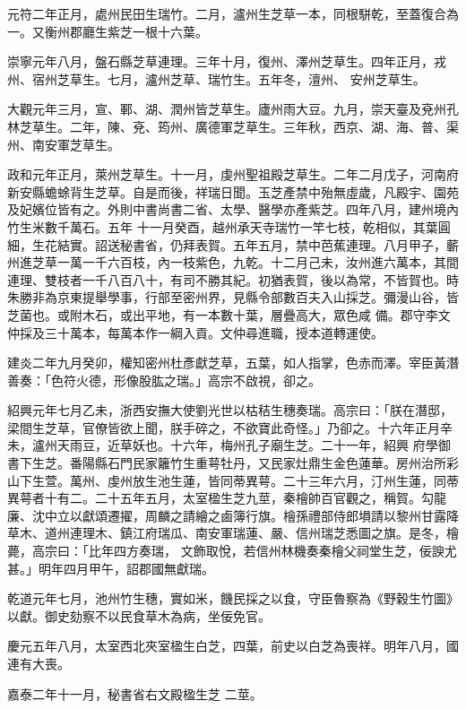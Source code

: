 \begin{pinyinscope}
 元符二年正月，處州民田生瑞竹。二月，瀘州生芝草一本，同根駢乾，至蓋復合為一。又衡州郡廳生紫芝一根十六葉。



 崇寧元年八月，盤石縣芝草連理。三年十月，復州、澤州芝草生。四年正月，戎州、宿州芝草生。七月，瀘州芝草、瑞竹生。五年冬，澶州、
 安州芝草生。



 大觀元年三月，宣、鄆、湖、潤州皆芝草生。廬州雨大豆。九月，崇天臺及兗州孔林芝草生。二年，陳、兗、筠州、廣德軍芝草生。三年秋，西京、湖、海、普、渠州、南安軍芝草生。



 政和元年正月，萊州芝草生。十一月，虔州聖祖殿芝草生。二年二月戊子，河南府新安縣蟾蜍背生芝草。自是而後，祥瑞日聞。玉芝產禁中殆無虛歲，凡殿宇、園苑及妃嬪位皆有之。外則中書尚書二省、太學、醫學亦產紫芝。四年八月，建州境內竹生米數千萬石。五年
 十一月癸酉，越州承天寺瑞竹一竿七枝，乾相似，其葉圓細，生花結實。詔送秘書省，仍拜表賀。五年五月，禁中芭蕉連理。八月甲子，蘄州進芝草一萬一千六百枝，內一枝紫色，九乾。十二月己未，汝州進六萬本，其間連理、雙枝者一千八百八十，有司不勝其紀。初猶表賀，後以為常，不皆賀也。時朱勝非為京東提舉學事，行部至密州界，見縣令部數百夫入山採芝。彌漫山谷，皆芝菌也。或附木石，或出平地，有一本數十葉，層疊高大，眾色咸
 備。郡守李文仲採及三十萬本，每萬本作一綱入貢。文仲尋進職，授本道轉運使。



 建炎二年九月癸卯，權知密州杜彥獻芝草，五葉，如人指掌，色赤而澤。宰臣黃潛善奏：「色符火德，形像股肱之瑞。」高宗不啟視，卻之。



 紹興元年七月乙未，浙西安撫大使劉光世以枯秸生穗奏瑞。高宗曰：「朕在潛邸，梁間生芝草，官僚皆欲上聞，朕手碎之，不欲寶此奇怪。」乃卻之。十六年正月辛未，瀘州天雨豆，近草妖也。十六年，梅州孔子廟生芝。二十一年，紹興
 府學御書下生芝。番陽縣石門民家籬竹生重萼牡丹，又民家灶鼎生金色蓮華。房州治所彩山下生萱。萬州、虔州放生池生蓮，皆同蒂異萼。二十三年六月，汀州生蓮，同蒂異萼者十有二。二十五年五月，太室楹生芝九莖，秦檜帥百官觀之，稱賀。勾龍廉、沈中立以獻頌遷擢，周麟之請繪之鹵簿行旗。檜孫禮部侍郎塤請以黎州甘露降草木、道州連理木、鎮江府瑞瓜、南安軍瑞蓮、嚴、信州瑞芝悉圖之旗。是冬，檜薨，高宗曰：「比年四方奏瑞，
 文飾取悅，若信州林機奏秦檜父祠堂生芝，佞諛尤甚。」明年四月甲午，詔郡國無獻瑞。



 乾道元年七月，池州竹生穗，實如米，饑民採之以食，守臣魯察為《野穀生竹圖》以獻。御史劾察不以民食草木為病，坐佞免官。



 慶元五年八月，太室西北夾室楹生白芝，四葉，前史以白芝為喪祥。明年八月，國連有大喪。



 嘉泰二年十一月，秘書省右文殿楹生芝
 二莖。



\end{pinyinscope}